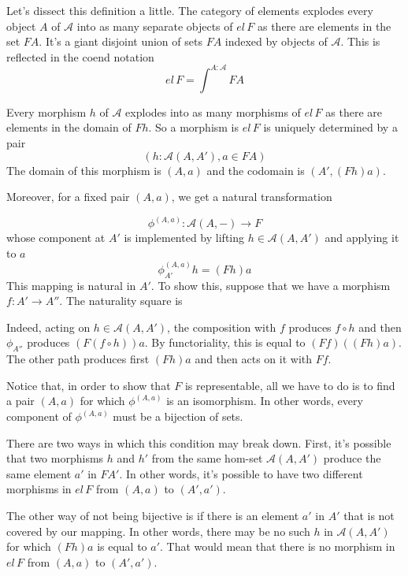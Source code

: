 \documentclass[11pt]{amsart}
\newcommand{\cat}[1]{\mathcal{#1}}
\begin{document}
Let's dissect this definition a little. The category of elements explodes every object $A$ of $\cat A$ into as many separate objects of $el \, F$ as there are elements in the set $F A$. It's a giant disjoint union of sets $F A$ indexed by objects of $\cat A$. This is reflected in the coend notation
\[ el \, F = \int^{A: \cat A} F A \]

Every morphism $h$ of $\cat A$ explodes into as many morphisms of $el \, F$ as there are elements in the domain of $F h$. So a morphism is $el \, F$ is uniquely determined by a pair 
\[(h \colon \cat A (A, A'), a \in F A)\]
The domain of this morphism is $(A, a)$ and the codomain is $(A', (F h) a)$.

Moreover, for a fixed pair $(A, a)$, we get a natural transformation

\[ \phi^{(A, a)} \colon \cat A (A, -) \to F\]
whose component at $A'$ is implemented by lifting $h \in \cat A (A, A')$ and applying it to $a$
\[ \phi^{(A, a)}_{A'} h = (F h) a\]
This mapping is natural in $A'$. To show this, suppose that we have a morphism $f \colon A' \to A''$. The naturality square is

 \begin{figure}[H]
\centering
{}
\end{figure}
Indeed, acting on $h \in \cat A (A, A')$, the composition with $f$ produces $f \circ h$ and then $\phi_{A''}$  produces $ (F (f \circ h)) a$. By functoriality, this is equal to $(F f) ((F h) a)$. The other path produces first $(F h) a$ and then acts on it with $F f$. 


Notice that, in order to show that $F$ is representable, all we have to do is to find a pair $(A, a)$ for which $\phi^{(A, a)}$ is an isomorphism. In other words, every component of $\phi^{(A, a)}$ must be a bijection of sets. 

There are two ways in which this condition may break down. First, it's possible that two morphisms $h$ and $h'$ from the same hom-set $\cat A (A, A')$ produce the same element $a'$ in $F A'$. In other words, it's possible to have two different morphisms in $el \, F$ from $(A, a)$ to $(A', a')$. 

The other way of not being bijective is if there is an element $a'$ in $A'$ that is not covered by our mapping. In other words, there may be no such $h$ in $\cat A (A, A')$ for which $(F h) a$ is equal to $a'$. That would mean that there is no morphism in $el \, F$ from $(A, a)$ to $(A', a')$.
\end{document}
